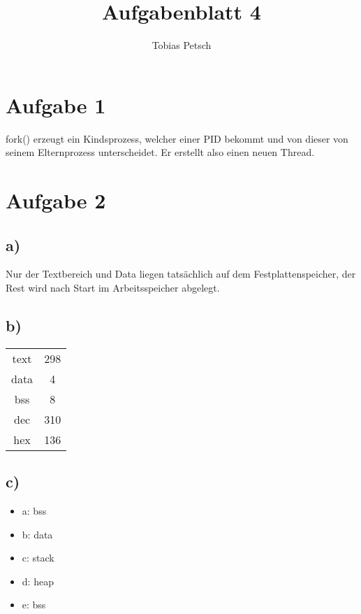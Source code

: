 \documentclass[a4paper,12pt]{article}
\title{Aufgabenblatt 4}
\author{Tobias Petsch}
\date{}
\begin{document}
\maketitle

\section*{Aufgabe 1}
fork() erzeugt ein Kindsprozess, welcher einer PID bekommt und von dieser von seinem Elternprozess unterscheidet.
Er erstellt also einen neuen Thread.

\section*{Aufgabe 2}

\subsection*{a)}

Nur der Textbereich und Data liegen tatsächlich auf dem Festplattenspeicher, der Rest wird nach Start im Arbeitsspeicher abgelegt.

\subsection*{b)}

\begin{table}[H]
    \centering
    \begin{tabular}{|c|c|}
    \hline
    text & 298 \\
    data   & 4   \\
    bss   & 8   \\
    dec & 310\\
    hex & 136 \\
    \hline
    \end{tabular}
\end{table}

\subsection*{c)}

\begin{itemize}
    \item a: bss
    \item b: data
    \item c: stack
    \item d: heap
    \item e: bss
\end{itemize}
\end{document}

